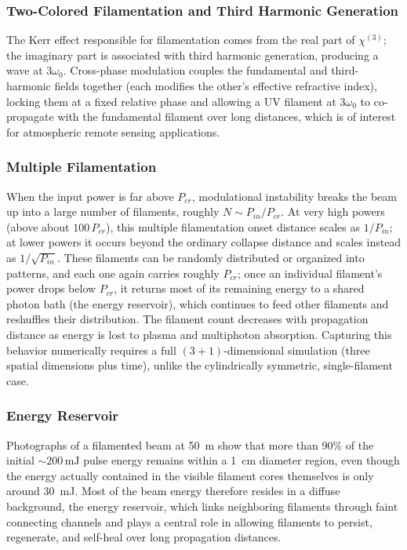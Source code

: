\documentclass[11pt,a4paper]{article}
\begin{document}
\subsubsection{Two-Colored Filamentation and Third Harmonic Generation}
The Kerr effect responsible for filamentation comes from the real part of $\chi^{(3)}$; the imaginary part is associated with third harmonic generation, producing a wave at $3\omega_0$. Cross-phase modulation couples the fundamental and third-harmonic fields together (each modifies the other's effective refractive index), locking them at a fixed relative phase and allowing a UV filament at $3\omega_0$ to co-propagate with the fundamental filament over long distances, which is of interest for atmospheric remote sensing applications.

\subsubsection{Multiple Filamentation}
When the input power is far above $P_{cr}$, modulational instability breaks the beam up into a large number of filaments, roughly $N\sim P_{in}/P_{cr}$. At very high powers (above about $100\,P_{cr}$), this multiple filamentation onset distance scales as $1/P_{in}$; at lower powers it occurs beyond the ordinary collapse distance and scales instead as $1/\sqrt{P_{in}}$. These filaments can be randomly distributed or organized into patterns, and each one again carries roughly $P_{cr}$; once an individual filament's power drops below $P_{cr}$, it returns most of its remaining energy to a shared photon bath (the energy reservoir), which continues to feed other filaments and reshuffles their distribution. The filament count decreases with propagation distance as energy is lost to plasma and multiphoton absorption. Capturing this behavior numerically requires a full $(3+1)$-dimensional simulation (three spatial dimensions plus time), unlike the cylindrically symmetric, single-filament case.

\subsubsection{Energy Reservoir}
Photographs of a filamented beam at 50~m show that more than 90\% of the initial $\sim200\,\text{mJ}$ pulse energy remains within a 1~cm diameter region, even though the energy actually contained in the visible filament cores themselves is only around 30~mJ. Most of the beam energy therefore resides in a diffuse background, the energy reservoir, which links neighboring filaments through faint connecting channels and plays a central role in allowing filaments to persist, regenerate, and self-heal over long propagation distances.
\end{document}
